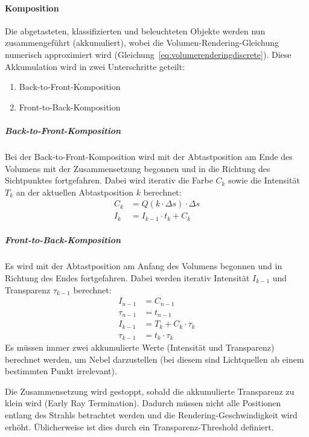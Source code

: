 			\paragraph{Komposition}
				Die abgetasteten, klassifizierten und beleuchteten Objekte werden nun zusammengeführt (akkumuliert), wobei die Volumen-Rendering-Gleichung numerisch approximiert wird (Gleichung~\eqref{eq:volumerenderingdiscrete}). Diese Akkumulation wird in zwei Unterschritte geteilt:
				\begin{enumerate}
					\item Back-to-Front-Komposition
					\item Front-to-Back-Komposition
				\end{enumerate}

				\subparagraph{Back-to-Front-Komposition}
					Bei der Back-to-Front-Komposition wird mit der Abtastposition am Ende des Volumens mit der Zusammensetzung begonnen und in die Richtung des Sichtpunktes fortgefahren. Dabei wird iterativ die Farbe \( C_k \) sowie die Intensität \( T_k \) an der aktuellen Abtastposition \( k \) berechnet:
					\begin{align*}
						C_k & = Q(k \cdot \Delta s) \cdot \Delta s \\
						I_k & = I_{k - 1} \cdot t_k + C_k
					\end{align*}

				\subparagraph{Front-to-Back-Komposition}
					Es wird mit der Abtastposition am Anfang des Volumens begonnen und in Richtung des Endes fortgefahren. Dabei werden iterativ Intensität \( I_{k - 1} \) und Transparenz \( \tau_{k - 1} \) berechnet:
					\begin{align*}
						I_{n - 1}    & = C_{n - 1}              \\
						\tau_{n - 1} & = t_{n - 1}              \\
						I_{k - 1}    & = T_k + C_k \cdot \tau_k \\
						\tau_{k - 1} & = t_k \cdot \tau_k
					\end{align*}
					Es müssen immer zwei akkumulierte Werte (Intensität und Transparenz) berechnet werden, um \zB Nebel darzustellen (bei diesem sind Lichtquellen ab einem bestimmten Punkt irrelevant).

					Die Zusammensetzung wird gestoppt, sobald die akkumulierte Transparenz zu klein wird (Early Ray Termination). Dadurch müssen nicht alle Positionen entlang des Strahls betrachtet werden und die Rendering-Geschwindigkeit wird erhöht. Üblicherweise ist dies durch ein Transparenz-Threshold definiert.

